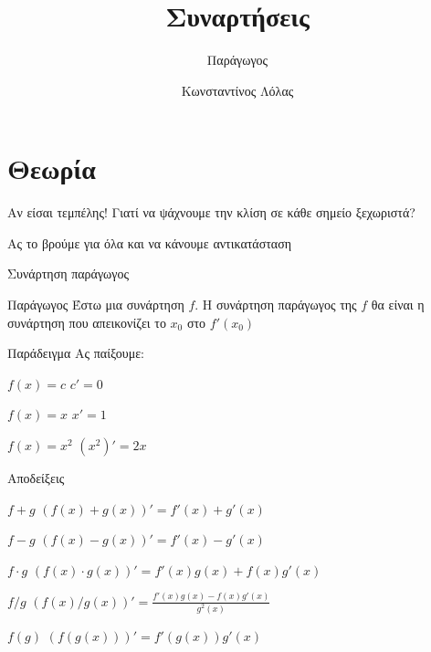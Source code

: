 \documentclass[greek]{beamer}
\title{Συναρτήσεις}
\subtitle{Παράγωγος}
\author[Λόλας]{Κωνσταντίνος Λόλας}
\date{}
\begin{document}
\begin{frame}
  \titlepage
\end{frame}

\section{Θεωρία}
\begin{frame}{Αν είσαι τεμπέλης!}
  Γιατί να ψάχνουμε την κλίση σε κάθε σημείο ξεχωριστά? \pause

  Ας το βρούμε για όλα και να κάνουμε αντικατάσταση
\end{frame}

\begin{frame}{Συνάρτηση παράγωγος}
  \begin{block}{Παράγωγος}
    Έστω μια συνάρτηση $f$. Η συνάρτηση παράγωγος της $f$ θα είναι η συνάρτηση που απεικονίζει το $x_0$ στο $f'(x_0)$
  \end{block}
\end{frame}

\begin{frame}{Παράδειγμα}
  Ας παίξουμε:
  \begin{block}{$f(x)=c$}
    $c'=0$
  \end{block} \pause

  \begin{block}{$f(x)=x$}
    $x'=1$
  \end{block} \pause

  \begin{block}{$f(x)=x^2$}
    $(x^2)'=2x$
  \end{block}
\end{frame}

\begin{frame}{Αποδείξεις}
  \begin{block}{$f+g$}
    $(f(x)+g(x))'=f'(x)+g'(x)$
  \end{block} \pause

  \begin{block}{$f-g$}
    $(f(x)-g(x))'=f'(x)-g'(x)$
  \end{block} \pause

  \begin{block}{$f\cdot g$}
    $(f(x)\cdot g(x))'=f'(x)g(x)+f(x)g'(x)$
  \end{block} \pause

  \begin{block}{$f/g$}
    $(f(x)/g(x))'=\frac{f'(x)g(x)-f(x)g'(x)}{g^2(x)}$
  \end{block} \pause

  \begin{block}{$f(g)$}
    $(f(g(x)))'=f'(g(x))g'(x)$
  \end{block}
\end{frame}
\end{document}
